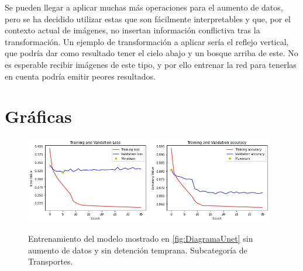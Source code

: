 Se pueden llegar a aplicar muchas más operaciones para el aumento de datos, pero se ha decidido utilizar estas que son fácilmente interpretables y que, por el contexto actual de imágenes, no insertan información conflictiva tras la transformación. Un ejemplo de transformación a aplicar sería el reflejo vertical, que podría dar como resultado tener el cielo abajo y un bosque arriba de este. No es esperable recibir imágenes de este tipo, y por ello entrenar la red para tenerlas en cuenta podría emitir peores resultados.

\section{Gráficas}

\begin{figure}[htpb]
  \centering
  \includegraphics[width=0.48\textwidth]{../../modelos-entrenados/unet/ejecucion1/lossUnet}
  \includegraphics[width=0.48\textwidth]{../../modelos-entrenados/unet/ejecucion1/accUnet}
  \caption{Entrenamiento del modelo mostrado en \autoref{fig:DiagramaUnet} sin aumento de datos y sin detención temprana. Subcategoría de Transportes.}
  \label{fig:ejec1}
\end{figure}

